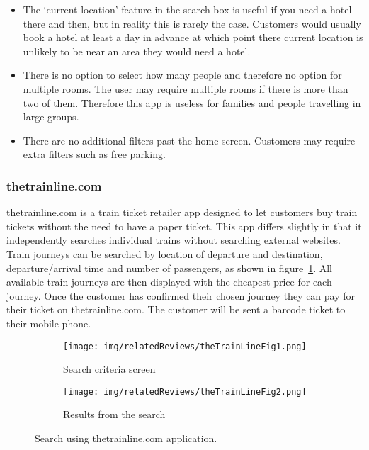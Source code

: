 \begin{itemize}
	\item The `current location' feature in the search box is useful if you
		need a hotel there and then, but in reality this is rarely the case.
		Customers would usually book a hotel at least a day in advance at which
		point there current location is unlikely to be near an area they would
		need a hotel.
	\item There is no option to select how many people and therefore no option
		for multiple rooms. The user may require multiple rooms if there is
		more than two of them. Therefore this app is useless for families and
		people travelling in large groups.
	\item There are no additional filters past the home screen. Customers may
		require extra filters such as free parking.
\end{itemize}

\subsubsection{thetrainline.com}
\label{ssub:thetrainline}

thetrainline.com is a train ticket retailer app designed to let customers buy
train tickets without the need to have a paper ticket. This app differs
slightly in that it independently searches individual trains without searching
external websites. Train journeys can be searched by location of departure and
destination, departure/arrival  time and number of passengers, as shown in
figure~\ref{fig:theTrainLineFig1}. All available train journeys are then
displayed with the cheapest price for each journey.  Once the customer has
confirmed their chosen journey they can pay for their ticket on
thetrainline.com. The customer will be sent a barcode ticket to their mobile
phone.
\begin{figure}[ht]
	\centering
	\begin{subfigure}[b]{0.2\textwidth}
		\texttt{[image: img/relatedReviews/theTrainLineFig1.png]}
		\caption{Search criteria screen}\label{fig:theTrainLineFig1}
	\end{subfigure}%
	\qquad
	\begin{subfigure}[b]{0.2\textwidth}
		\texttt{[image: img/relatedReviews/theTrainLineFig2.png]}
		\caption{Results from the search}\label{fig:theTrainLineFig2}
	\end{subfigure}
	\caption{Search using thetrainline.com application.
	}\label{fig:thetrainline1}
\end{figure}

